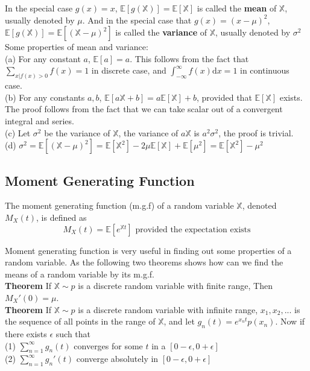 \documentclass[a4paper,12pt]{article}
\begin{document}
In the special case $g(x) = x$, $\mathbb{E}[g(\mathbb{X})] = \mathbb{E}[\mathbb{X}]$ is called the \textbf{mean} of $\mathbb{X}$, usually denoted by $\mu$. And in the special case that $g(x) = (x-\mu)^2$, $\mathbb{E}[g(\mathbb{X})] = \mathbb{E}[(\mathbb{X}-\mu)^2]$ is called the \textbf{variance} of $\mathbb{X}$, usually denoted by $\sigma^2$\\

Some properties of mean and variance:\\
(a) For any constant $a$, $\mathbb{E}[a] = a$. This follows from the fact that ${\sum_{x|f(x)>0}f(x) = 1}$ in discrete case, and ${\int_{-\infty}^{\infty}f(x)\mathrm{d}x = 1}$ in continuous case.\\
(b) For any constants $a, b$, $\mathbb{E}[a\mathbb{X}+b] = a\mathbb{E}[\mathbb{X}]+b$, provided that $\mathbb{E}[\mathbb{X}]$ exists. The proof follows from the fact that we can take scalar out of a convergent integral and series.\\
(c) Let $\sigma^2$ be the variance of $\mathbb{X}$, the variance of $a\mathbb{X}$ is $a^2\sigma^2$, the proof is trivial.\\
(d) $\sigma^2 = \mathbb{E}[(\mathbb{X}-\mu)^2] = \mathbb{E}[\mathbb{X}^2]-2\mu\mathbb{E}[\mathbb{X}]+\mathbb{E}[\mu^2] = \mathbb{E}[\mathbb{X}^2] - \mu^2$


\subsection{Moment Generating Function}
The moment generating function (m.g.f) of a random variable $\mathbb{X}$, denoted $M_X(t)$, is defined as
$$M_X(t) = \mathbb{E}[e^{\mathbb{X}t}]\text{ provided the expectation exists}$$

Moment generating function is very useful in finding out some properties of a random variable. As the following two theorems shows how can we find the means of a random variable by its m.g.f.\\

\textbf{Theorem} If $\mathbb{X} \sim p$ is a discrete random variable with finite range, Then $M_X'(0) = \mu$.\\

\textbf{Theorem} If $\mathbb{X} \sim p$ is a discrete random variable with infinite range, $x_1, x_2, ...$ is the sequence of all points in the range of $\mathbb{X}$, and let $g_n(t) = e^{x_n t}p(x_n)$. Now if there exists $\epsilon$ such that\\
(1) $\sum_{n=1}^\infty g_n(t)$ converges for some $t$ in a $[0-\epsilon, 0+\epsilon]$\\
(2) $\sum_{n=1}^\infty g_n'(t)$ converge absolutely in $[0-\epsilon, 0+\epsilon]$\\
\end{document}
